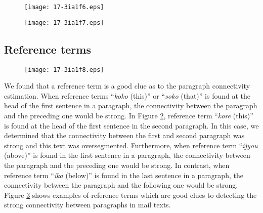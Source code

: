 \documentclass[english]{jnlp_1.4}
\begin{document}
\begin{figure}[b]
\begin{center}
\texttt{[image: 17-3ia1f6.eps]}
\end{center}
\label{fig:An example of conjunction tokorode (by the way)}
\end{figure}
\begin{figure}[b]
\begin{center}
\texttt{[image: 17-3ia1f7.eps]}
\end{center}
\label{fig:An example of reference term kore (this)}
\end{figure}




\subsection{Reference terms}   
\label{subsec:Reference terms}

\begin{figure}[b]
\begin{center}
\texttt{[image: 17-3ia1f8.eps]}
\end{center}
 \label{fig:examples of clue reference terms}
\end{figure}


We found that 
a reference term is
a good clue as to the paragraph connectivity estimation.
When reference terms 
``\textit{koko} (this)'' or ``\textit{soko} (that)'' is found 
at the head of the first sentence in a paragraph, 
the connectivity between the paragraph and the preceding one would be strong.
In Figure \ref{fig:An example of reference term kore (this)}, 
reference term ``\textit{kore} (this)'' is found 
at the head of the first sentence in the second paragraph.
In this case, 
we determined that 
the connectivity between the first and second paragraph was strong and 
this text was oversegmented.
Furthermore, 
when reference term
``\textit{ijyou} (above)'' is found in the first sentence in a paragraph, 
the connectivity between the paragraph and the preceding one would be strong.
In contrast, 
when reference term 
``\textit{ika} (below)'' is found in the last sentence in a paragraph, 
the connectivity between the paragraph and the following one would be strong.
Figure \ref{fig:examples of clue reference terms} shows 
examples of reference terms 
which are good clues to detecting the strong connectivity 
between paragraphs in mail texts. 
\end{document}
